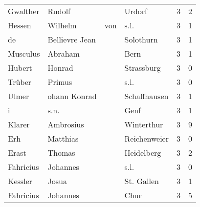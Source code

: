 \begin{tabular}{llllrr}
                 Gwalther &                             Rudolf &             &                                      Urdorf &          3 &         2 \\
                   Hessen &                            Wilhelm &         von &                                        s.l. &          3 &         1 \\
                       de &                     Bellievre Jean &             &                                   Solothurn &          3 &         1 \\
                 Musculus &                            Abraham &             &                                        Bern &          3 &         1 \\
                   Hubert &                             Honrad &             &                                  Strassburg &          3 &         0 \\
                   Trüber &                             Primus &             &                                        s.l. &          3 &         0 \\
                    Ulmer &                       ohann Konrad &             &                                Schaffhausen &          3 &         1 \\
                        i &                               s.n. &             &                                        Genf &          3 &         1 \\
                   Klarer &                          Ambrosius &             &                                  Winterthur &          3 &         9 \\
                      Erh &                           Matthias &             &                                Reichenweier &          3 &         0 \\
                    Erast &                             Thomas &             &                                  Heidelberg &          3 &         2 \\
                Fahricius &                           Johannes &             &                                        s.l. &          3 &         0 \\
                  Kessler &                              Josua &             &                                  St. Gallen &          3 &         1 \\
                Fahricius &                           Johannes &             &                                        Chur &          3 &         5 \\

\end{tabular}
